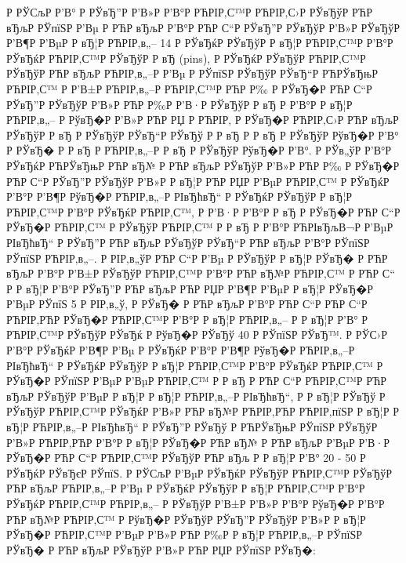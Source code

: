\documentclass[a4paper,14pt]{extarticle}
\begin{document}
Р  РЎСљР  Р’В° Р  РЎвЂ”Р  Р’В»Р  Р’В°Р РЋРІР‚С™Р РЋРІР‚С›Р  РЎвЂўР РЋР вЂљР  РЎпїЅР  Р’Вµ Р РЋР вЂљР  Р’В°Р РЋР С“Р  РЎвЂ”Р  РЎвЂўР  Р’В»Р  РЎвЂўР  Р’В¶Р  Р’ВµР  Р вЂ¦Р РЋРІР‚в„– 14 Р  РЎвЂќР  РЎвЂўР  Р вЂ¦Р РЋРІР‚С™Р  Р’В°Р  РЎвЂќР РЋРІР‚С™Р  РЎвЂўР  Р вЂ  (pins), Р  РЎвЂќР  РЎвЂўР РЋРІР‚С™Р  РЎвЂўР РЋР вЂљР РЋРІР‚в„–Р  Р’Вµ Р  РЎпїЅР  РЎвЂўР  РЎвЂ“Р РЋРЎвЂњР РЋРІР‚С™ Р  Р’В±Р РЋРІР‚в„–Р РЋРІР‚С™Р РЋР Р‰ Р  РЎвЂ�Р РЋР С“Р  РЎвЂ”Р  РЎвЂўР  Р’В»Р РЋР Р‰Р  Р’В·Р  РЎвЂўР  Р вЂ Р  Р’В°Р  Р вЂ¦Р РЋРІР‚в„– Р  РўвЂ�Р  Р’В»Р РЋР РЏ Р РЋРІР‚ Р  РЎвЂ�Р РЋРІР‚С›Р РЋР вЂљР  РЎвЂўР  Р вЂ Р  РЎвЂўР  РЎвЂ“Р  РЎвЂў Р  Р вЂ Р  Р вЂ Р  РЎвЂўР  РўвЂ�Р  Р’В° Р  РЎвЂ� Р  Р вЂ Р РЋРІР‚в„–Р  Р вЂ Р  РЎвЂўР  РўвЂ�Р  Р’В°. Р  РЎв„ўР  Р’В°Р  РЎвЂќР РЋРЎвЂњР РЋР вЂ№ Р РЋР вЂљР  РЎвЂўР  Р’В»Р РЋР Р‰ Р  РЎвЂ�Р РЋР С“Р  РЎвЂ”Р  РЎвЂўР  Р’В»Р  Р вЂ¦Р РЋР РЏР  Р’ВµР РЋРІР‚С™ Р  РЎвЂќР  Р’В°Р  Р’В¶Р  РўвЂ�Р РЋРІР‚в„–Р  РІвЂћвЂ“ Р  РЎвЂќР  РЎвЂўР  Р вЂ¦Р РЋРІР‚С™Р  Р’В°Р  РЎвЂќР РЋРІР‚С™, Р  Р’В·Р  Р’В°Р  Р вЂ Р  РЎвЂ�Р РЋР С“Р  РЎвЂ�Р РЋРІР‚С™ Р  РЎвЂўР РЋРІР‚С™ Р  Р вЂ Р  Р’В°Р РЋРІвЂљВ¬Р  Р’ВµР  РІвЂћвЂ“ Р  РЎвЂ”Р РЋР вЂљР  РЎвЂўР  РЎвЂ“Р РЋР вЂљР  Р’В°Р  РЎпїЅР  РЎпїЅР РЋРІР‚в„–. Р  РІР‚в„ўР РЋР С“Р  Р’Вµ Р  РЎвЂўР  Р вЂ¦Р  РЎвЂ� Р РЋР вЂљР  Р’В°Р  Р’В±Р  РЎвЂўР РЋРІР‚С™Р  Р’В°Р РЋР вЂ№Р РЋРІР‚С™ Р РЋР С“ Р  Р вЂ¦Р  Р’В°Р  РЎвЂ”Р РЋР вЂљР РЋР РЏР  Р’В¶Р  Р’ВµР  Р вЂ¦Р  РЎвЂ�Р  Р’ВµР  РЎпїЅ 5 Р  РІР‚в„ў, Р  РЎвЂ� Р РЋР вЂљР  Р’В°Р РЋР С“Р РЋР С“Р РЋРІР‚РЋР  РЎвЂ�Р РЋРІР‚С™Р  Р’В°Р  Р вЂ¦Р РЋРІР‚в„– Р  Р вЂ¦Р  Р’В° Р РЋРІР‚С™Р  РЎвЂўР  РЎвЂќ Р  РўвЂ�Р  РЎвЂў 40 Р  РЎпїЅР  РЎвЂ™. Р  РЎС›Р  Р’В°Р  РЎвЂќР  Р’В¶Р  Р’Вµ Р  РЎвЂќР  Р’В°Р  Р’В¶Р  РўвЂ�Р РЋРІР‚в„–Р  РІвЂћвЂ“ Р  РЎвЂќР  РЎвЂўР  Р вЂ¦Р РЋРІР‚С™Р  Р’В°Р  РЎвЂќР РЋРІР‚С™ Р  РЎвЂ�Р  РЎпїЅР  Р’ВµР  Р’ВµР РЋРІР‚С™ Р  Р вЂ Р РЋР С“Р РЋРІР‚С™Р РЋР вЂљР  РЎвЂўР  Р’ВµР  Р вЂ¦Р  Р вЂ¦Р РЋРІР‚в„–Р  РІвЂћвЂ“, Р  Р вЂ¦Р  РЎвЂў Р  РЎвЂўР РЋРІР‚С™Р  РЎвЂќР  Р’В»Р РЋР вЂ№Р РЋРІР‚РЋР РЋРІР‚пїЅР  Р вЂ¦Р  Р вЂ¦Р РЋРІР‚в„–Р  РІвЂћвЂ“ Р  РЎвЂ”Р  РЎвЂў Р РЋРЎвЂњР  РЎпїЅР  РЎвЂўР  Р’В»Р РЋРІР‚РЋР  Р’В°Р  Р вЂ¦Р  РЎвЂ�Р РЋР вЂ№ Р РЋР вЂљР  Р’ВµР  Р’В·Р  РЎвЂ�Р РЋР С“Р РЋРІР‚С™Р  РЎвЂўР РЋР вЂљ Р  Р вЂ¦Р  Р’В° 20 - 50 Р  РЎвЂќР  РЎвЂєР  РЎпїЅ. Р  РЎСљР  Р’ВµР  РЎвЂќР  РЎвЂўР РЋРІР‚С™Р  РЎвЂўР РЋР вЂљР РЋРІР‚в„–Р  Р’Вµ Р  РЎвЂќР  РЎвЂўР  Р вЂ¦Р РЋРІР‚С™Р  Р’В°Р  РЎвЂќР РЋРІР‚С™Р РЋРІР‚в„– Р  РЎвЂўР  Р’В±Р  Р’В»Р  Р’В°Р  РўвЂ�Р  Р’В°Р РЋР вЂ№Р РЋРІР‚С™ Р  РўвЂ�Р  РЎвЂўР  РЎвЂ”Р  РЎвЂўР  Р’В»Р  Р вЂ¦Р  РЎвЂ�Р РЋРІР‚С™Р  Р’ВµР  Р’В»Р РЋР Р‰Р  Р вЂ¦Р РЋРІР‚в„–Р  РЎпїЅР  РЎвЂ� Р РЋР вЂљР  РЎвЂўР  Р’В»Р РЋР РЏР  РЎпїЅР  РЎвЂ�:
\end{document}
